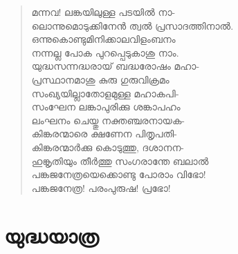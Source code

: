 \begin{verse}
മന്നവ! ലങ്കയിലുള്ള പടയില്‍ നാ-\\
ലൊന്നുമൊടുക്കിനേന്‍ ത്വല്‍ പ്രസാദത്തിനാല്‍.\\
ഒന്നുകൊണ്ടുമിനിക്കാലവിളംബനം\\
നന്നല്ല പോക പുറപ്പെടുകാശു നാം.\\
യുദ്ധസന്നദ്ധരായ് ബദ്ധരോഷം മഹാ-\\
പ്രസ്ഥാനമാശു കുരു ഗുരുവിക്രമം\\
സംഖ്യയില്ലാതോളമുള്ള മഹാകപി-\\
സംഘേന ലങ്കാപുരിക്കു ശങ്കാപഹം\\
ലംഘനം ചെയ്തു നക്തഞ്ചരനായക-\\
കിങ്കരന്മാരെ ക്ഷണേന പിതൃപതി-\\
കിങ്കരന്മാര്‍ക്കു കൊടുത്തു, ദശാനന-\\
ഹുങ്കൃതിയും തീര്‍ത്തു സംഗരാന്തേ ബലാല്‍\\
പങ്കജനേത്രയെക്കൊണ്ടു പോരാം വിഭോ!\\
പങ്കജനേത്ര! പരംപുരുഷ! പ്രഭോ!
\end{verse}


\section{യുദ്ധയാത്ര}

